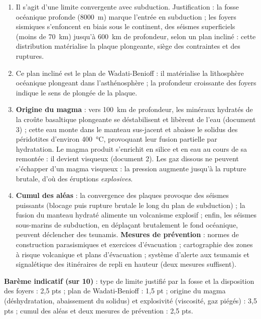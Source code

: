 \documentclass[11pt]{article}
\newcommand{\cle}[1]{{\popxbold\color{popdark}#1}}
\begin{document}
\begin{corrige}
\begin{enumerate}
\item Il s'agit d'une limite \cle{convergente avec subduction}. Justification : la fosse océanique profonde (\SI{8000}{m}) marque l'entrée en subduction ; les foyers sismiques s'enfoncent en biais sous le continent, des séismes superficiels (moins de \SI{70}{km}) jusqu'à \SI{600}{km} de profondeur, selon un plan incliné : cette distribution matérialise la plaque plongeante, siège des contraintes et des ruptures.
\item Ce plan incliné est le \cle{plan de Wadati-Benioff} : il matérialise la lithosphère océanique plongeant dans l'asthénosphère ; la profondeur croissante des foyers indique le sens de plongée de la plaque.
\item \textbf{Origine du magma} : vers \SI{100}{km} de profondeur, les minéraux hydratés de la croûte basaltique plongeante se déstabilisent et libèrent de l'eau (document 3) ; cette eau monte dans le manteau sus-jacent et abaisse le solidus des péridotites d'environ \SI{400}{\celsius}, provoquant leur fusion partielle par hydratation. Le magma produit s'enrichit en silice et en eau au cours de sa remontée : il devient \cle{visqueux} (document 2). Les gaz dissous ne peuvent s'échapper d'un magma visqueux : la pression augmente jusqu'à la rupture brutale, d'où des éruptions \emph{explosives}.
\item \textbf{Cumul des aléas} : la convergence des plaques provoque des séismes puissants (blocage puis rupture brutale le long du plan de subduction) ; la fusion du manteau hydraté alimente un volcanisme explosif ; enfin, les séismes sous-marins de subduction, en déplaçant brutalement le fond océanique, peuvent déclencher des \cle{tsunamis}. \textbf{Mesures de prévention} : normes de construction parasismiques et exercices d'évacuation ; cartographie des zones à risque volcanique et plans d'évacuation ; système d'alerte aux tsunamis et signalétique des itinéraires de repli en hauteur (deux mesures suffisent).
\end{enumerate}
\textbf{Barème indicatif (sur 10)} : type de limite justifié par la fosse et la disposition des foyers : 2,5 pts ; plan de Wadati-Benioff : 1,5 pt ; origine du magma (déshydratation, abaissement du solidus) et explosivité (viscosité, gaz piégés) : 3,5 pts ; cumul des aléas et deux mesures de prévention : 2,5 pts.
\end{corrige}
\end{document}
